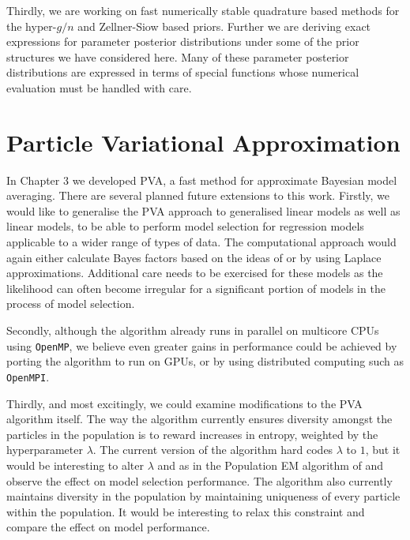 Thirdly, we are working on fast numerically stable quadrature based methods for
the hyper-$g/n$ and Zellner-Siow based priors. Further we are deriving exact 
expressions for parameter posterior distributions under some of the prior 
structures we have considered here. Many of these parameter posterior distributions
are expressed in terms of special functions whose numerical evaluation must
be handled with care.


\section{Particle Variational Approximation}

In Chapter 3 we developed PVA, a fast method for approximate Bayesian model averaging. There are several planned future extensions to this work. Firstly, we would
like to generalise the PVA approach to generalised linear models as well as
linear models, to be able to perform model selection for regression models
applicable to a wider range of types of data. The computational approach would
again either calculate Bayes factors based on the ideas of \cite{Li2015} or by using Laplace
approximations. Additional care needs to be exercised for these models as the likelihood can often become irregular for a
significant portion of models in the process of model selection.

Secondly, although the algorithm already runs in parallel on multicore CPUs
using \texttt{OpenMP}, we believe even greater gains in performance could be
achieved by porting the algorithm to run on GPUs, or by using distributed
computing such as \texttt{OpenMPI}.

Thirdly, and most excitingly, we could examine modifications to the PVA
algorithm itself. The way the algorithm currently ensures diversity amongst the
particles in the population is to reward increases in entropy, weighted by the
hyperparameter $\lambda$. The current version of the algorithm hard codes
$\lambda$ to $1$, but it would be interesting to alter $\lambda$ and as in the
Population EM algorithm of \cite{Rockova2017} and observe the effect on model
selection performance. The algorithm also currently maintains diversity in the
population by maintaining uniqueness of every particle within the population.
It would be interesting to relax this constraint and compare the effect on
model performance.



